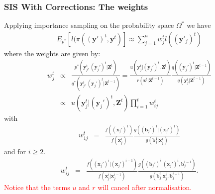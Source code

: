 \documentclass[9pt, xcolor={dvipsnames,svgnames,table}]{beamer}
\begin{document}
\begin{frame}
    \frametitle{SIS With Corrections: The weights}
    Applying importance sampling on the probability space $\Omega^*$ we have
    \begin{align*}
        E_{p^*}[l(\pi (\bm{(y')}^{t}, \bm{y}^{t})] 
        \approx \sum_{j=1}^n  w^{t}_j l((\bm{y}'_j)^{t})
    \end{align*}
    where the weights are given by:
    \begin{eqnarray*}
        w^{t}_j &\propto& \frac{p^*(\bm{y}_j^{t}, (\bm{y}_j')^{t} | \bm{Z}^{t})} {q^*(\bm{y}_j^{t}, (\bm{y}_j')^{t} |\bm{Z}^{t-1})}
        = \frac{u(\bm{y}_j^{t} | (\bm{y}_j')^{t}, \bm{Z}^{t})}{r(\bm{z}^{t} | \bm{Z}^{t-1})} \frac{q((\bm{y}_j')^{t} | \bm{Z}^{t-1})}{q(\bm{y}_j^{t} | \bm{Z}^{t-1})} \\
        & \propto & u(\bm{y}_j^{t} | (\bm{y}_j')^{t}, \bm{Z}^{t}) \prod_{i=1}^{t} w^{t}_{ij}
    \end{eqnarray*}
    with
    \begin{eqnarray*}
        w^{t}_{1j} &=& \frac{f((\bm{x}_j')^1)}{f(\bm{x}_j^1)} \frac{g((\bm{b}_j')^1 | (\bm{x}_j')^1)}{g(\bm{b}_j^1 | \bm{x}_j^1)}
    \end{eqnarray*}
    and for $i \geq 2$.
    \begin{eqnarray*}
        w^{t}_{ij} &=& \frac{f((\bm{x}_j')^i | (\bm{x}_j')^{i-1})}{f(\bm{x}_j^i | \bm{x}_j^{i-1})} \frac{g((\bm{b}_j')^i | (\bm{x}_j')^i, \bm{b}_j^{i-1})}{g(\bm{b}_j^i | \bm{x}_j^i, \bm{b}_j^{i-1})}.
    \end{eqnarray*}
    \textcolor{Red}{Notice that the terms $u$ and $r$ will cancel after normalisation.}
\end{frame}
\end{document}
